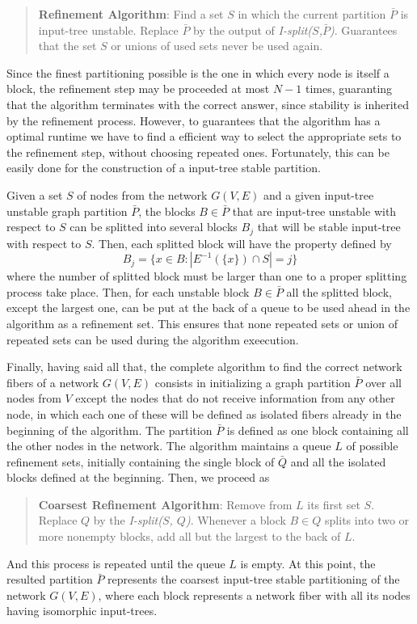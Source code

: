 \documentclass[12pt]{diazessay} %
\begin{document}
\begin{quotation}
	\textbf{Refinement Algorithm}: Find a set $S$ in which the current partition $\bar{P}$ is input-tree unstable. Replace $\bar{P}$ by the output of \textit{I-split($S$,$\bar{P}$)}. Guarantees that the set $S$ or unions of used sets never be used again.
\end{quotation}

Since the finest partitioning possible is the one in which every node is itself a block, the refinement step may be proceeded at most $N-1$ times, guaranting that the algorithm terminates with the correct answer, since stability is inherited by the refinement process. However, to guarantees that the algorithm has a optimal runtime we have to find a efficient way to select the appropriate sets to the refinement step, without choosing repeated ones. Fortunately, this can be easily done for the construction of a input-tree stable partition.

Given a set $S$ of nodes from the network $G(V, E)$ and a given input-tree unstable graph partition $\bar{P}$, the blocks $B \in \bar{P}$ that are input-tree unstable with respect to $S$ can be splitted into several blocks $B_j$ that will be stable input-tree with respect to $S$. Then, each splitted block will have the property defined by
\begin{equation}
	B_j = \{ x \in B : | E^{-1}(\{x\}) \cap S | = j \}
\end{equation}
where the number of splitted block must be larger than one to a proper splitting process take place. Then, for each unstable block $B \in \bar{P}$ all the splitted block, except the largest one, can be put at the back of a queue to be used ahead in the algorithm as a refinement set. This ensures that none repeated sets or union of repeated sets can be used during the algorithm exeecution.

Finally, having said all that, the complete algorithm to find the correct network fibers of a network $G(V, E)$ consists in initializing a graph partition $\bar{P}$ over all nodes from $V$ except the nodes that do not receive information from any other node, in which each one of these will be defined as isolated fibers already in the beginning of the algorithm. The partition $\bar{P}$ is defined as one block containing all the other nodes in the network. The algorithm maintains a queue $L$ of possible refinement sets, initially containing the single block of $\bar{Q}$ and all the isolated blocks defined at the beginning. Then, we proceed as
\begin{quotation}
	\textbf{Coarsest Refinement Algorithm}: Remove from $L$ its first set $S$. Replace $Q$ by the \textit{I-split($S$, $Q$)}. Whenever a block $B \in Q$ splits into two or more nonempty blocks, add all but the largest to the back of $L$.
\end{quotation}
And this process is repeated until the queue $L$ is empty. At this point, the resulted partition $\bar{P}$ represents the coarsest input-tree stable partitioning of the network $G(V, E)$, where each block represents a network fiber with all its nodes having isomorphic input-trees.
\end{document}
